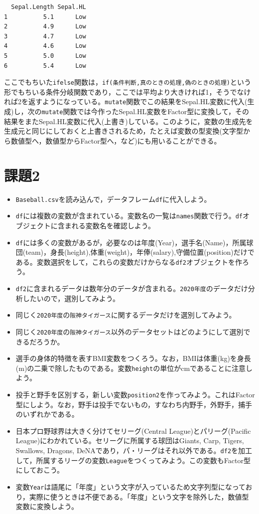 \documentclass[
  a4paper,
]{ltjsbook}
\providecommand{\tightlist}{%
  \setlength{\itemsep}{0pt}\setlength{\parskip}{0pt}}\usepackage{longtable,booktabs,array}
\begin{document}
\begin{verbatim}
  Sepal.Length Sepal.HL
1          5.1      Low
2          4.9      Low
3          4.7      Low
4          4.6      Low
5          5.0      Low
6          5.4      Low
\end{verbatim}

ここでもちいた\texttt{ifelse}関数は，\texttt{if(条件判断,真のときの処理,偽のときの処理)}という形でもちいる条件分岐関数であり，ここでは平均より大きければ1，そうでなければ2を返すようになっている。\texttt{mutate}関数でこの結果をSepal.HL変数に代入(生成)し，次の\texttt{mutate}関数では今作ったSepal.HL変数をFactor型に変換して，その結果をまたSepal.HL変数に代入(上書き)している。このように，変数の生成先を生成元と同じにしておくと上書きされるため，たとえば変数の型変換(文字型から数値型へ，数値型からFactor型へ，など)にも用いることができる。

\section{課題2}\label{ux8ab2ux984c2}

\begin{itemize}
\tightlist
\item
  \texttt{Baseball.csv}を読み込んで，データフレーム\texttt{df}に代入しよう。
\item
  \texttt{df}には複数の変数が含まれている。変数名の一覧は\texttt{names}関数で行う。\texttt{df}オブジェクトに含まれる変数名を確認しよう。
\item
  \texttt{df}には多くの変数があるが，必要なのは年度(Year)，選手名(Name)，所属球団(team)，身長(height),体重(weight)，年俸(salary),守備位置(position)だけである。変数選択をして，これらの変数だけからなる\texttt{df2}オブジェクトを作ろう。
\item
  \texttt{df2}に含まれるデータは数年分のデータが含まれる。\texttt{2020年度}のデータだけ分析したいので，選別してみよう。
\item
  同じく\texttt{2020年度}の\texttt{阪神タイガース}に関するデータだけを選別してみよう。
\item
  同じく\texttt{2020年度}の\texttt{阪神タイガース}以外のデータセットはどのようにして選別できるだろうか。
\item
  選手の身体的特徴を表すBMI変数をつくろう。なお，BMIは体重(kg)を身長(m)の二乗で除したものである。変数\texttt{height}の単位がcmであることに注意しよう。
\item
  投手と野手を区別する，新しい変数\texttt{position2}を作ってみよう。これはFactor型にしよう。なお，野手は投手でないもの，すなわち内野手，外野手，捕手のいずれかである。
\item
  日本プロ野球界は大きく分けてセリーグ(Central League)とパリーグ(Pacific
  League)にわかれている。セリーグに所属する球団はGiants, Carp, Tigers,
  Swallows, Dragons,
  DeNAであり，パ・リーグはそれ以外である。\texttt{df2}を加工して，所属するリーグの変数\texttt{League}をつくってみよう。この変数もFactor型にしておこう。
\item
  変数\texttt{Year}は語尾に「年度」という文字が入っているため文字列型になっており，実際に使うときは不便である。「年度」という文字を除外した，数値型変数に変換しよう。
\end{itemize}
\end{document}
